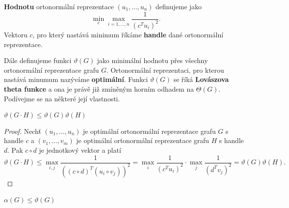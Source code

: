 \noindent \textbf{Hodnotu} ortonormální reprezentace $\left(u_1, \dots, u_n \right)$ definujeme jako
$$
    \min_c \max_{i = 1, \dots, n} \frac{1}{\left( c^T u_i \right)^2}.
$$
Vektoru $c$, pro který nastává minimum říkáme \textbf{handle} dané ortonormální reprezentace.

Dále definujeme funkci $\vartheta(G)$ jako minimální hodnotu přes všechny ortonormální reprezentace grafu $G$. Ortonormální reprezentaci, pro kterou nastává minumum nazýváme \textbf{optimální}. Funkci $\vartheta(G)$ se říká \textbf{Lovászova theta funkce} a ona je právě již zmíněným horním odhadem na $\Theta(G)$. Podívejme se na některé její vlastnosti.

\begin{lm}
    $\vartheta(G \cdot H) \leq \vartheta(G) \vartheta(H)$
\end{lm}

\begin{proof}
    Nechť $\left( u_1, \dots, u_n \right)$ je optimální ortonormální reprezentace grafu $G$ s handle $c$ a $\left( v_1, \dots, v_m \right)$ je optimální ortonormální reprezentace grafu $H$ s handle $d$. Pak $c \circ d$ je jednotkový vektor a platí
    $$
        \vartheta(G \cdot H) \leq \max_{i,j} \frac{1}{\left( \left( c \circ d \right)^T \left( u_i \circ v_j \right) \right)^2} = \max_i \frac{1}{\left( c^T u_i \right)^2} \cdot \max_j \frac{1}{\left( d^T v_j \right)^2} = \vartheta(G)\vartheta(H).
    $$
\end{proof}

\begin{lm}
    $\alpha(G) \leq \vartheta(G)$
\end{lm}

